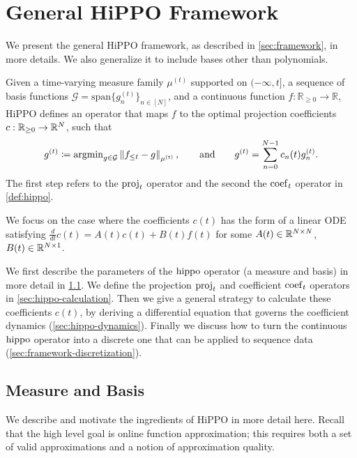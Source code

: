 \documentclass[../hippo.tex]{subfiles}
\begin{document}
\section{General HiPPO Framework}
\label{sec:hippo-framework-details}



We present the general HiPPO framework, as described in \cref{sec:framework}, in
more details.
We also generalize it to include bases other than polynomials.

Given a time-varying measure family $\mu^{(t)}$ supported on $(-\infty, t]$,
a sequence of basis functions $\mathcal{G} = \mathrm{span} \{g_n^{(t)}\}_{n \in [N]}$,
and a continuous function $f \colon \mathbb{R}_{\geq 0} \to \mathbb{R}$,
HiPPO defines an operator that maps $f$ to the optimal projection coefficients
$c: \mathbb{R}_{\geq 0} \to \mathbb{R}^N$, such that
\begin{equation*}
  g^{(t)} \coloneqq \mathrm{argmin}_{g \in \mathcal{G}} \left\|{f_{\leq t} - g}\right\|_{\mu^{(t)}},
  \qquad \text{and} \qquad
  g^{(t)} = \sum_{n=0}^{N-1} c_n(t) g_n^{(t)}.
\end{equation*}
The first step refers to the $\operatorname{proj}_t$ operator and the second the $\operatorname{coef}_t$
operator in \cref{def:hippo}.

We focus on the case where the coefficients $c(t)$ has the form of a linear
ODE satisfying $\frac{d}{dt} c(t) = A(t) c(t) + B(t) f(t)$ for some
$A(t) \in \mathbb{R}^{N \times N}$, $B(t) \in \mathbb{R}^{N \times 1}$.

We first describe the parameters of the $\operatorname{hippo}$ operator (a measure and basis) in more detail in \cref{sec:hippo-measure}.
We define the projection $\operatorname{proj}_t$ and coefficient $\operatorname{coef}_t$ operators in \cref{sec:hippo-calculation}.
Then we give a general strategy to calculate these coefficients $c(t)$, by deriving a differential equation that governs the coefficient dynamics (\cref{sec:hippo-dynamics}).
Finally we discuss how to turn the continuous $\operatorname{hippo}$ operator into a discrete
one that can be applied to sequence data (\cref{sec:framework-discretization}).

\subsection{Measure and Basis}
\label{sec:hippo-measure}

We describe and motivate the ingredients of HiPPO in more detail here.
Recall that the high level goal is online function approximation;
this requires both a set of valid approximations and a notion of approximation quality.
\end{document}
